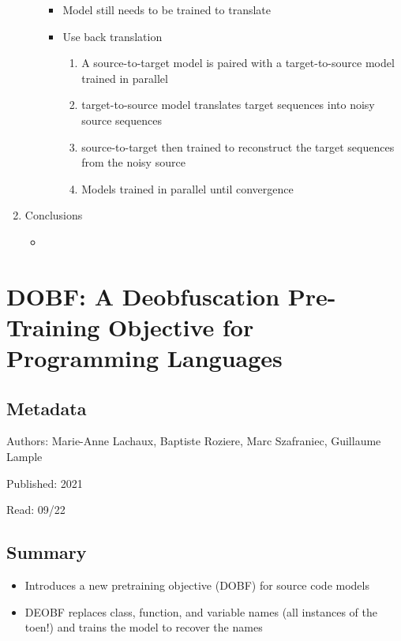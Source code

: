 \documentclass{article}
\begin{document}
\begin{enumerate}
\begin{enumerate}
\begin{itemize}
			\item Model still needs to be trained to translate
			\item Use back translation
			\begin{enumerate}
				\item A source-to-target model is paired with a target-to-source model trained in parallel
				\item target-to-source model translates target sequences into noisy source sequences
				\item source-to-target then trained to reconstruct the target sequences from the noisy source
				\item Models trained in parallel until convergence
			\end{enumerate}
		\end{itemize}
	\end{enumerate}
	\item Conclusions
	\begin{itemize}
		\item 
	\end{itemize}
\end{enumerate}

\pagebreak


\section*{DOBF: A Deobfuscation Pre-Training Objective for Programming Languages}

\subsection*{Metadata}

\noindent Authors: Marie-Anne Lachaux, Baptiste Roziere, Marc Szafraniec, Guillaume Lample

\noindent Published: 2021

\noindent Read: 09/22

\subsection*{Summary}
\begin{itemize}
	\item Introduces a new pretraining objective (DOBF) for source code models
	\item DEOBF replaces class, function, and variable names (all instances of the toen!) and trains the model to recover the names
\end{itemize}
\end{document}
